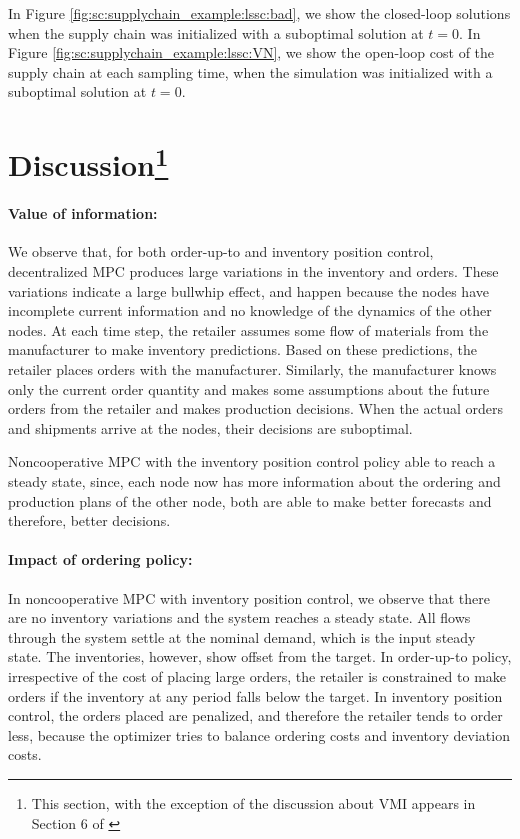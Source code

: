 In Figure \ref{fig:sc:supplychain_example:lssc:bad}, we
show the closed-loop solutions when the supply chain was initialized
with a suboptimal solution at $t=0$.  In Figure \ref{fig:sc:supplychain_example:lssc:VN}, we
show the open-loop cost of the supply chain at each sampling time,
when the simulation was initialized with a suboptimal solution at $t=0$.



\section{Discussion\footnote{This section, with the exception of the
    discussion about VMI appears in Section 6 of \citet{subramanian:rawlings:maravelias:2012}}}
\label{sec:sc:discussion}
\paragraph{Value of information:}
We observe that, for both order-up-to and inventory position control,
decentralized MPC produces large variations in the inventory and
orders. These variations indicate a large bullwhip effect, and
happen because the nodes have incomplete current information and no knowledge
of the dynamics of the other nodes. At each time step, the retailer 
assumes some flow of materials from the manufacturer to make inventory
predictions. Based on these predictions, the retailer places orders
with the manufacturer. Similarly, the manufacturer knows only the
current order quantity and  makes some assumptions about the future
orders from the retailer and makes production decisions. When
the actual orders and shipments arrive at the nodes, their decisions
are suboptimal.

Noncooperative MPC with the inventory position control policy  able
to reach a steady state, since, each node now has more information
about the ordering and production plans of the other node, both are able
to make better forecasts and therefore, better decisions.


\paragraph{Impact of ordering policy:}
In noncooperative MPC with inventory position control, we observe that
there are no inventory variations and the system reaches a
steady state. All flows through the system settle at the nominal
demand, which is the input steady state. The inventories, however,
show offset from the target. In order-up-to policy, irrespective of the
cost of placing large orders, the retailer is constrained to make
orders if the inventory at any period falls below the target.
In inventory position control, the orders placed are penalized, and therefore the retailer tends to order less, because the
optimizer tries to balance ordering costs and inventory deviation
costs. 


